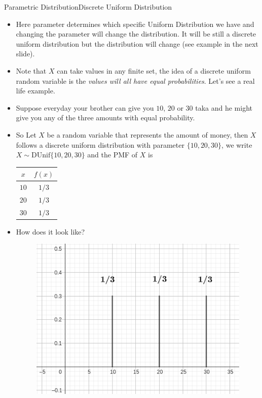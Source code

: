 \documentclass[8pt, usepdftitle = false]{beamer}
\begin{document}
\begin{frame}[allowframebreaks]{Parametric Distribution}{Discrete Uniform Distribution}
\begin{itemize}
\item Here parameter determines which specific Uniform Distribution we have and changing the parameter will change the distribution. It will be still a discrete uniform distribution but the distribution will change (see example in the next slide).


\item Note that $X$ can take values in any finite set, the idea of a discrete uniform random variable is the \emph{values will all have equal probabilities}. Let's see a real life example.


\framebreak

\item  Suppose everyday your brother can give you $10$, $20$ or $30$ taka and he might give you any of the three amounts with equal probability. 


\item So Let $X$ be a random variable that represents the amount of money, then $X$ follows a discrete uniform distribution with parameter $\{10, 20, 30\}$, we write $X \sim \mathrm{DUnif}\{10, 20, 30\}$ and the PMF of $X$ is

\begin{table}[H]
\centering
	\begin{tabular}{c|c}
$x$ & $f(x)$ \\
\hline $10$ & $1 / 3$ \\
$20$ &  $1/3$  \\
$30$ & $1/3$
\end{tabular}
\end{table}

\item How does it look like?

\begin{figure}
	\includegraphics[scale = .4]{Images/DiscreteUniform.png}
\end{figure}


\end{itemize}
\end{frame}
\end{document}
